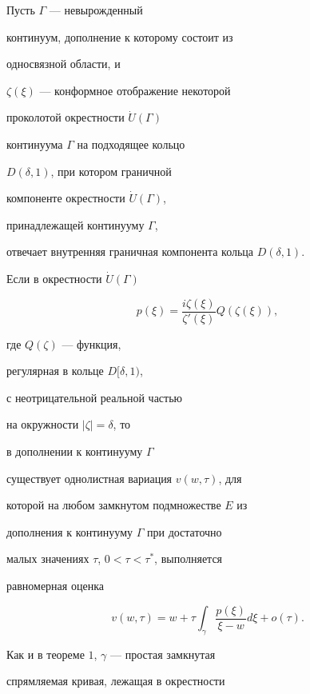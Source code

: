 \begin{thm}


Пусть $\Gamma$ --- невырожденный


континуум, дополнение к которому состоит из 


односвязной области, и


$\zeta(\xi)$ --- конформное отображение некоторой


проколотой окрестности $\Dot{U}(\Gamma)$


континуума $\Gamma$ на подходящее кольцо


$D(\delta,1)$, при котором граничной 


компоненте окрестности $\Dot{U}(\Gamma)$,


принадлежащей континууму $\Gamma$,


отвечает внутренняя граничная компонента кольца $D(\delta,1)$.


Если в окрестности $\Dot{U}(\Gamma)$


\begin{equation}


p(\xi)=\frac{i\zeta(\xi)}{\zeta'(\xi)}Q(\zeta(\xi)),


\end{equation}


где $Q(\zeta)$ --- функция, 


регулярная в кольце $D[\delta,1)$, 


с неотрицательной реальной частью


на окружности $|\zeta|=\delta$, то


в дополнении к континууму $\Gamma$


существует однолистная вариация $v(w,\tau)$, для


которой на любом замкнутом подмножестве $E$ из


дополнения к континууму $\Gamma$ при достаточно


малых значениях $\tau$, $0<\tau<\tau^{*}$, выполняется


равномерная оценка


\begin{equation}


v(w,\tau)=w+\tau\int_{\gamma}\frac{p(\xi)}


{\xi-w}d\xi+o(\tau).


\end{equation}


Как и в теореме $1$, $\gamma$ --- простая замкнутая


спрямляемая кривая, лежащая в окрестности 



\end{thm}
